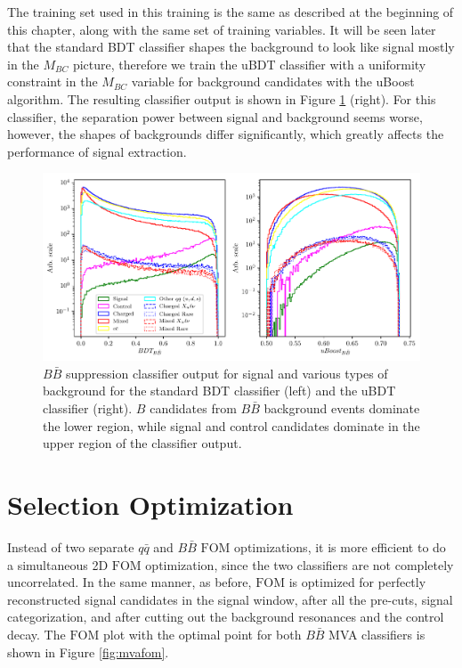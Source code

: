 The training set used in this training is the same as described at the beginning of this chapter, along with the same set of training variables. It will be seen later that the standard BDT classifier shapes the background to look like signal mostly in the $M_{BC}$ picture, therefore we train the uBDT classifier with a uniformity constraint in the $M_{BC}$ variable for background candidates with the uBoost algorithm. The resulting classifier output is shown in Figure \ref{fig:bbmva} (right). For this classifier, the separation power between signal and background seems worse, however, the shapes of backgrounds differ significantly, which greatly affects the performance of signal extraction.

\begin{figure}[H]
	\centering
	\captionsetup{width=0.8\linewidth}
	\includegraphics[width=\linewidth]{fig/bb_BDT}
	\caption{$B\bar B$ suppression classifier output for signal and various types of background for the standard BDT classifier (left) and the uBDT classifier (right). $B$ candidates from $B\bar B$ background events dominate the lower region, while signal and control candidates dominate in the upper region of the classifier output.}
	\label{fig:bbmva}
\end{figure}

\section{Selection Optimization}\label{sec:selection-optimization}

Instead of two separate $q \bar q$ and $B \bar B$ $\mathrm{FOM}$ optimizations, it is more efficient to do a simultaneous 2D $\mathrm{FOM}$ optimization, since the two classifiers are not completely uncorrelated. In the same manner, as before, $\mathrm{FOM}$ is optimized for perfectly reconstructed signal candidates in the signal window, after all the pre-cuts, signal categorization, and after cutting out the background resonances and the control decay. The $\mathrm{FOM}$ plot with the optimal point for both $B \bar B$ MVA classifiers is shown in Figure \ref{fig:mvafom}.

